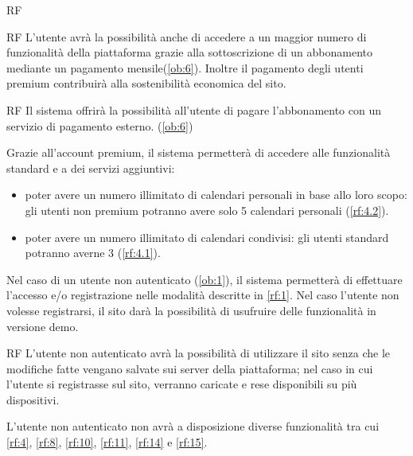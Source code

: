 \begin{listaPersonale}{RF}
\begin{listaPersonale2}{RF}
		 L'utente avrà la possibilità anche di accedere a un maggior numero di funzionalità della piattaforma grazie alla sottoscrizione di un abbonamento mediante un pagamento mensile(\ref{ob:6}). Inoltre il pagamento degli utenti premium contribuirà alla sostenibilità economica del sito.

		\begin{listaPersonale3}{RF}
			 Il sistema offrirà la possibilità all'utente di pagare l'abbonamento con un servizio di pagamento esterno. (\ref{ob:6})

			 Grazie all'account premium, il sistema permetterà di accedere alle funzionalità standard e a dei servizi aggiuntivi:
			\begin{itemize}
				\item poter avere un numero illimitato di calendari personali in base allo loro scopo: gli utenti non premium potranno avere solo 5 calendari personali (\ref{rf:4.2}).
				\item poter avere un numero illimitato di calendari condivisi: gli utenti standard potranno averne 3 (\ref{rf:4.1}).
			\end{itemize}

		\end{listaPersonale3}
	\end{listaPersonale2}

	 Nel caso di un utente non autenticato (\ref{ob:1}), il sistema permetterà di effettuare l'accesso e/o registrazione nelle modalità descritte in \ref{rf:1}. Nel caso l'utente non volesse registrarsi, il sito darà la possibilità di usufruire delle funzionalità in versione demo.

	\begin{listaPersonale2}{RF}
			L'utente non autenticato avrà la possibilità di utilizzare il sito senza che le modifiche fatte vengano salvate sui server della piattaforma; nel caso in cui l'utente si registrasse sul sito, verranno caricate e rese disponibili su più dispositivi.

		\begin{listaPersonale3}{}
			 L'utente non autenticato non avrà a disposizione diverse funzionalità tra cui \ref{rf:4}, \ref{rf:8}, \ref{rf:10}, \ref{rf:11}, \ref{rf:14} e \ref{rf:15}.
		\end{listaPersonale3}
	\end{listaPersonale2}


\end{listaPersonale}
